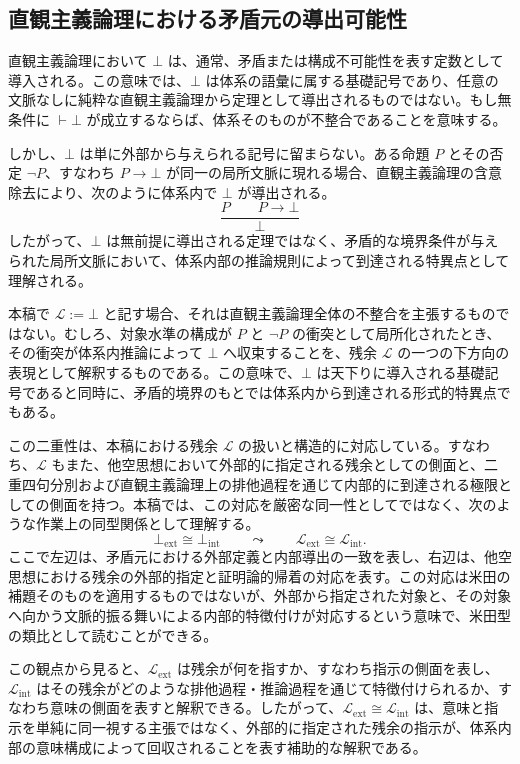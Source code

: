 \documentclass[11pt,a4paper]{article}
\newcommand{\lhagma}{\mathcal{L}}
\theoremstyle{definition}
\begin{document}
\subsection{直観主義論理における矛盾元の導出可能性}

直観主義論理において $\bot$ は、通常、矛盾または構成不可能性を表す定数として導入される。この意味では、$\bot$ は体系の語彙に属する基礎記号であり、任意の文脈なしに純粋な直観主義論理から定理として導出されるものではない。もし無条件に $\vdash \bot$ が成立するならば、体系そのものが不整合であることを意味する。

しかし、$\bot$ は単に外部から与えられる記号に留まらない。ある命題 $P$ とその否定 $\neg P$、すなわち $P \to \bot$ が同一の局所文脈に現れる場合、直観主義論理の含意除去により、次のように体系内で $\bot$ が導出される。
\[
\frac{P \qquad P \to \bot}{\bot}
\]
したがって、$\bot$ は無前提に導出される定理ではなく、矛盾的な境界条件が与えられた局所文脈において、体系内部の推論規則によって到達される特異点として理解される。

本稿で $\lhagma := \bot$ と記す場合、それは直観主義論理全体の不整合を主張するものではない。むしろ、対象水準の構成が $P$ と $\neg P$ の衝突として局所化されたとき、その衝突が体系内推論によって $\bot$ へ収束することを、残余 $\lhagma$ の一つの下方向の表現として解釈するものである。この意味で、$\bot$ は天下りに導入される基礎記号であると同時に、矛盾的境界のもとでは体系内から到達される形式的特異点でもある。

この二重性は、本稿における残余 $\lhagma$ の扱いと構造的に対応している。すなわち、$\lhagma$ もまた、他空思想において外部的に指定される残余としての側面と、二重四句分別および直観主義論理上の排他過程を通じて内部的に到達される極限としての側面を持つ。本稿では、この対応を厳密な同一性としてではなく、次のような作業上の同型関係として理解する。
\[
\bot_{\mathrm{ext}} \cong \bot_{\mathrm{int}}
\qquad \leadsto \qquad
\lhagma_{\mathrm{ext}} \cong \lhagma_{\mathrm{int}} .
\]
ここで左辺は、矛盾元における外部定義と内部導出の一致を表し、右辺は、他空思想における残余の外部的指定と証明論的帰着の対応を表す。この対応は米田の補題そのものを適用するものではないが、外部から指定された対象と、その対象へ向かう文脈的振る舞いによる内部的特徴付けが対応するという意味で、米田型の類比として読むことができる。

この観点から見ると、$\lhagma_{\mathrm{ext}}$ は残余が何を指すか、すなわち指示の側面を表し、$\lhagma_{\mathrm{int}}$ はその残余がどのような排他過程・推論過程を通じて特徴付けられるか、すなわち意味の側面を表すと解釈できる。したがって、$\lhagma_{\mathrm{ext}} \cong \lhagma_{\mathrm{int}}$ は、意味と指示を単純に同一視する主張ではなく、外部的に指定された残余の指示が、体系内部の意味構成によって回収されることを表す補助的な解釈である。
\end{document}
